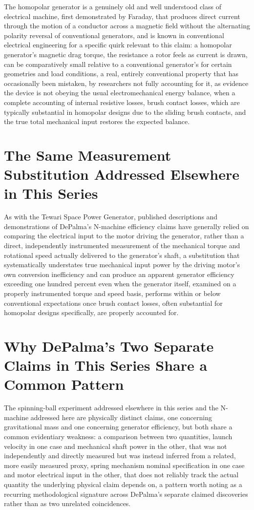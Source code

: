 \documentclass[11pt]{article}
\begin{document}
The homopolar generator is a genuinely old and well understood class of electrical machine, first demonstrated by Faraday, that produces direct current through the motion of a conductor across a magnetic field without the alternating polarity reversal of conventional generators, and is known in conventional electrical engineering for a specific quirk relevant to this claim: a homopolar generator's magnetic drag torque, the resistance a rotor feels as current is drawn, can be comparatively small relative to a conventional generator's for certain geometries and load conditions, a real, entirely conventional property that has occasionally been mistaken, by researchers not fully accounting for it, as evidence the device is not obeying the usual electromechanical energy balance, when a complete accounting of internal resistive losses, brush contact losses, which are typically substantial in homopolar designs due to the sliding brush contacts, and the true total mechanical input restores the expected balance.

\section{The Same Measurement Substitution Addressed Elsewhere in This Series}

As with the Tewari Space Power Generator, published descriptions and demonstrations of DePalma's N-machine efficiency claims have generally relied on comparing the electrical input to the motor driving the generator, rather than a direct, independently instrumented measurement of the mechanical torque and rotational speed actually delivered to the generator's shaft, a substitution that systematically understates true mechanical input power by the driving motor's own conversion inefficiency and can produce an apparent generator efficiency exceeding one hundred percent even when the generator itself, examined on a properly instrumented torque and speed basis, performs within or below conventional expectations once brush contact losses, often substantial for homopolar designs specifically, are properly accounted for.

\section{Why DePalma's Two Separate Claims in This Series Share a Common Pattern}

The spinning-ball experiment addressed elsewhere in this series and the N-machine addressed here are physically distinct claims, one concerning gravitational mass and one concerning generator efficiency, but both share a common evidentiary weakness: a comparison between two quantities, launch velocity in one case and mechanical shaft power in the other, that was not independently and directly measured but was instead inferred from a related, more easily measured proxy, spring mechanism nominal specification in one case and motor electrical input in the other, that does not reliably track the actual quantity the underlying physical claim depends on, a pattern worth noting as a recurring methodological signature across DePalma's separate claimed discoveries rather than as two unrelated coincidences.
\end{document}
